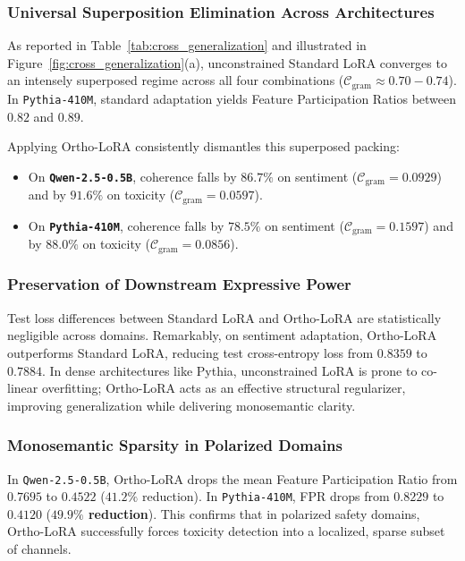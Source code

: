 \documentclass[10pt,twocolumn,letterpaper]{article}
\begin{document}
\subsubsection{Universal Superposition Elimination Across Architectures}
As reported in Table~\ref{tab:cross_generalization} and illustrated in Figure~\ref{fig:cross_generalization}(a), unconstrained Standard LoRA converges to an intensely superposed regime across all four combinations ($\mathcal{C}_{\text{gram}} \approx 0.70 - 0.74$). In \texttt{Pythia-410M}, standard adaptation yields Feature Participation Ratios between $0.82$ and $0.89$.

Applying Ortho-LoRA consistently dismantles this superposed packing:
\begin{itemize}
    \item On \textbf{\texttt{Qwen-2.5-0.5B}}, coherence falls by \textbf{$86.7\%$} on sentiment ($\mathcal{C}_{\text{gram}} = 0.0929$) and by \textbf{$91.6\%$} on toxicity ($\mathcal{C}_{\text{gram}} = 0.0597$).
    \item On \textbf{\texttt{Pythia-410M}}, coherence falls by \textbf{$78.5\%$} on sentiment ($\mathcal{C}_{\text{gram}} = 0.1597$) and by \textbf{$88.0\%$} on toxicity ($\mathcal{C}_{\text{gram}} = 0.0856$).
\end{itemize}

\subsubsection{Preservation of Downstream Expressive Power}
Test loss differences between Standard LoRA and Ortho-LoRA are statistically negligible across domains. Remarkably, on sentiment adaptation, Ortho-LoRA outperforms Standard LoRA, reducing test cross-entropy loss from $0.8359$ to \textbf{$0.7884$}. In dense architectures like Pythia, unconstrained LoRA is prone to co-linear overfitting; Ortho-LoRA acts as an effective structural regularizer, improving generalization while delivering monosemantic clarity.

\subsubsection{Monosemantic Sparsity in Polarized Domains}
In \texttt{Qwen-2.5-0.5B}, Ortho-LoRA drops the mean Feature Participation Ratio from $0.7695$ to $0.4522$ ($41.2\%$ reduction). In \texttt{Pythia-410M}, FPR drops from $0.8229$ to $0.4120$ (\textbf{$49.9\%$ reduction}). This confirms that in polarized safety domains, Ortho-LoRA successfully forces toxicity detection into a localized, sparse subset of channels.
\end{document}
